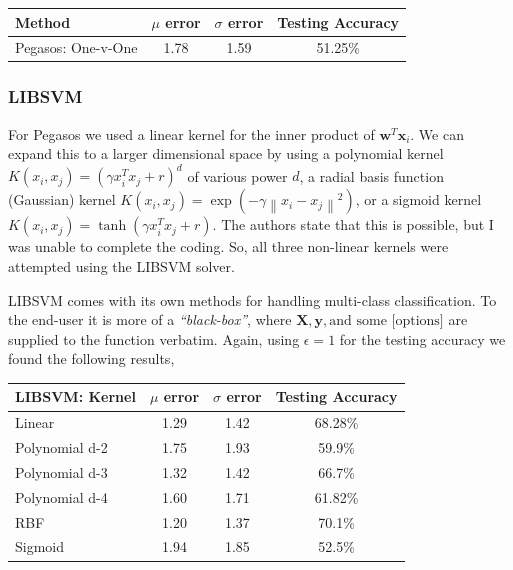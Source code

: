 \documentclass[fleqn]{article}
\begin{document}
\begin{table}[htbp]
	\centering
		\begin{tabular}{ | l | c | c | c |}
  		\hline                        
  		\textbf{Method} & \textbf{$\mu$ error} & \textbf{$\sigma$ error} & \textbf{Testing Accuracy} \\ \hline
  		Pegasos: One-v-One & 1.78 & 1.59 & 51.25\% \\ \hline
		\end{tabular}
	\label{table:AccuracyPegasos}
\end{table}

\subsubsection{LIBSVM}
\label{subsub:LIBSVM}
For Pegasos we used a linear kernel for the inner product of $\mathbf{w}^T \mathbf{x}_i$.  We can expand this to a larger dimensional space by using a polynomial kernel $K(x_i , x_j) = (\gamma x_i^T x_j + r)^d$ of various power $d$, a radial basis function (Gaussian) kernel $K(x_i , x_j) = \exp(-\gamma \left\|x_i - x_j\right\|^2)$, or a sigmoid kernel $K(x_i , x_j) = \tanh(\gamma x_i^T x_j + r)$.  The authors state that this is possible\cite{Shwartz:2007}, but I was unable to complete the coding.  So, all three non-linear kernels were attempted using the LIBSVM solver\cite{LIBSVM}.

LIBSVM comes with its own methods for handling multi-class classification.  To the end-user it is more of a \textit{``black-box''}, where $\mathbf{X}, \mathbf{y}, \text{and some [options]}$ are supplied to the function verbatim.  Again, using $\epsilon = 1$ for the testing accuracy we found the following results,

\begin{table}[htbp]
	\centering
		\begin{tabular}{ | l | c | c | c |}
  		\hline                        
  		\textbf{LIBSVM: Kernel} & \textbf{$\mu$ error} & \textbf{$\sigma$ error} & \textbf{Testing Accuracy} \\ \hline
  		 Linear & 1.29 & 1.42 & 68.28\% \\ \hline
  		 Polynomial d-2 & 1.75 & 1.93 & 59.9\% \\ \hline
  		 Polynomial d-3 & 1.32 & 1.42 & 66.7\% \\ \hline
  		 Polynomial d-4 & 1.60 & 1.71 & 61.82\% \\ \hline
  		 RBF & 1.20 & 1.37 & 70.1\% \\ \hline
  		 Sigmoid & 1.94 & 1.85 & 52.5\% \\ \hline
		\end{tabular}
	\label{table:AccuracyLIBSVM}
\end{table}
\end{document}
